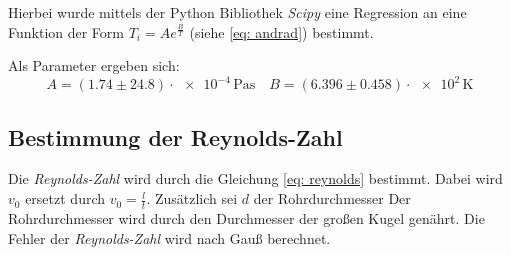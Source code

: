 Hierbei wurde mittels der Python Bibliothek \emph{Scipy} eine
Regression an eine Funktion der Form $T_i = Ae^{\frac{B}{T}}$ (siehe \eqref{eq: andrad}) bestimmt. %

Als Parameter ergeben sich:
\begin{equation}
 \label{eq:reg_wert} %
A=\left(\num{1.74}\pm\num{24.8}\right)\cdot\num{e-4}\,\si{\pascal\second} \quad B=\left(\num{6.396} \pm\num{0.458}\right)\cdot\num{e+2}\,\si{\kelvin} %
\end{equation}

\subsection{Bestimmung der Reynolds-Zahl}

Die \emph{Reynolds-Zahl} wird durch die Gleichung \eqref{eq: reynolds} bestimmt.
Dabei wird $v_0$ ersetzt durch $v_0=\frac{l}{t}$.
Zusätzlich sei $d$ der Rohrdurchmesser  %
Der Rohrdurchmesser wird durch den Durchmesser der großen Kugel genährt.
Die Fehler der \emph{Reynolds-Zahl} wird nach Gauß berechnet. %



